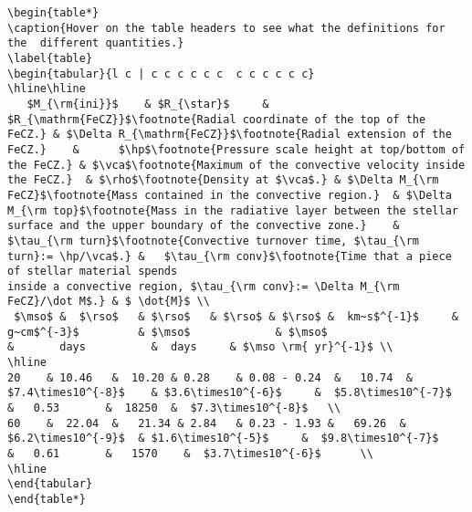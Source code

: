 \newline\begin{verbatim}
\begin{table*}
\caption{Hover on the table headers to see what the definitions for the  different quantities.}
\label{table}
\begin{tabular}{l c | c c c c c c  c c c c c c}
\hline\hline
   $M_{\rm{ini}}$    & $R_{\star}$     & $R_{\mathrm{FeCZ}}$\footnote{Radial coordinate of the top of the FeCZ.} & $\Delta R_{\mathrm{FeCZ}}$\footnote{Radial extension of the FeCZ.}    &      $\hp$\footnote{Pressure scale height at top/bottom of the FeCZ.} & $\vca$\footnote{Maximum of the convective velocity inside the FeCZ.}  & $\rho$\footnote{Density at $\vca$.} & $\Delta M_{\rm FeCZ}$\footnote{Mass contained in the convective region.}  & $\Delta M_{\rm top}$\footnote{Mass in the radiative layer between the stellar surface and the upper boundary of the convective zone.}    & $\tau_{\rm turn}$\footnote{Convective turnover time, $\tau_{\rm turn}:= \hp/\vca$.} &   $\tau_{\rm conv}$\footnote{Time that a piece of stellar material spends 
inside a convective region, $\tau_{\rm conv}:= \Delta M_{\rm FeCZ}/\dot M$.} & $ \dot{M}$ \\
 $\mso$ &  $\rso$   & $\rso$   & $\rso$ & $\rso$ &  km~s$^{-1}$     & g~cm$^{-3}$         & $\mso$             & $\mso$                            &       days          &  days     & $\mso \rm{ yr}^{-1}$ \\
\hline
20    & 10.46   &  10.20 & 0.28    & 0.08 - 0.24  &   10.74  &  $7.4\times10^{-8}$    & $3.6\times10^{-6}$     &  $5.8\times10^{-7}$       &   0.53       &  18250  &  $7.3\times10^{-8}$   \\
60    &  22.04  &   21.34 & 2.84   & 0.23 - 1.93 &   69.26  &    $6.2\times10^{-9}$  & $1.6\times10^{-5}$     &  $9.8\times10^{-7}$     &   0.61       &   1570    &  $3.7\times10^{-6}$      \\
\hline
\end{tabular}
\end{table*} 
\end{verbatim}
